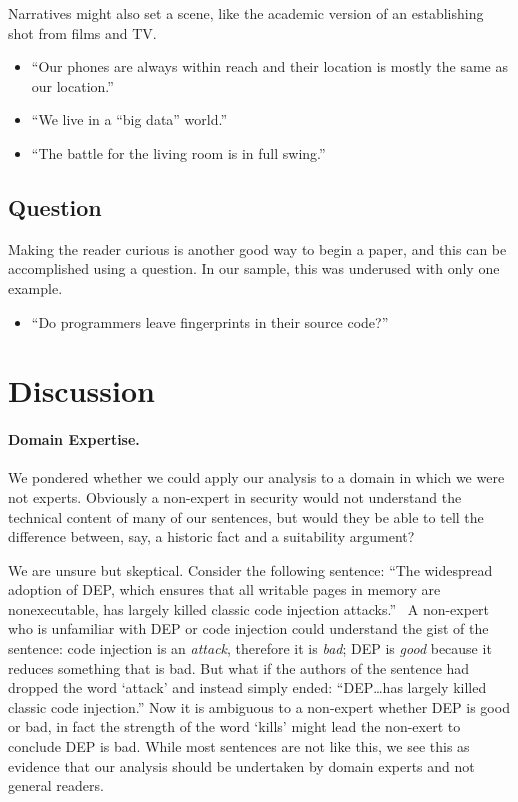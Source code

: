 \documentclass[sigconf,anonymous]{acmart}
\begin{document}
	Narratives might also set a scene, like the academic version of an establishing shot from films and TV.
	
	\begin{itemize}
		
		\item 	``Our phones are always within reach and their location is mostly the same as our location.''~\cite{michalevsky2015powerspy}
		
		\item 	``We live in a “big data” world.''~\cite{lecuyer2014xray}
		
		\item 	``The battle for the living room is in full swing.''~\cite{oren2014aether}
	\end{itemize}
	
	
	\subsection{Question} 
	
	Making the reader curious is another good way to begin a paper, and this can be accomplished using a question. In our sample, this was underused with only one example.
	\begin{itemize}
		\item ``Do programmers leave fingerprints in their source code?''~\cite{caliskan2015anonymizing}
	\end{itemize}
	
	
	\section{Discussion}
	\label{sec:disc}
	
	
	\paragraph{Domain Expertise.} We pondered whether we could apply our analysis to a domain in which we were not experts. Obviously a non-expert in security would not understand the technical content of many of our sentences, but would they be able to tell the difference between, say, a historic fact and a suitability argument? 
	
	We are unsure but skeptical. Consider the following sentence: ``The widespread adoption of DEP, which ensures that all writable pages in memory are nonexecutable, has largely killed classic code injection attacks.''~\cite{carlini2014rop} A non-expert who is unfamiliar with DEP or code injection could understand the gist of the sentence: code injection is an \textit{attack}, therefore it is \textit{bad}; DEP is \textit{good} because it reduces something that is bad. But what if the authors of the sentence had dropped the word `attack' and instead simply ended: ``DEP\ldots has largely killed classic code injection.'' Now it is ambiguous to a non-expert whether DEP is good or bad, in fact the strength of the word `kills' might lead the non-exert to conclude DEP is bad. While most sentences are not like this, we see this as evidence that our analysis should be undertaken by domain experts and not general readers.
	
\end{document}
